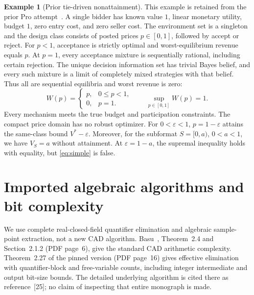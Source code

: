 \documentclass[11pt,a4paper]{article}
\numberwithin{equation}{section}
\theoremstyle{definition}
\newtheorem{example}[theorem]{Example}
\begin{document}
\begin{example}[Prior tie-driven nonattainment]\label{ex:nonattainment}
This example is retained from the prior Pro attempt~\cite{PriorPro}.
A single bidder has known value \(1\), linear monetary utility, budget
\(1\), zero entry cost, and zero seller cost.
The environment set is a singleton and the design class consists of
posted prices \(p\in[0,1]\), followed by accept or reject.
For \(p<1\), acceptance is strictly optimal and worst-equilibrium
revenue equals \(p\).
At \(p=1\), every acceptance mixture is sequentially rational,
including certain rejection.
The unique decision information set has trivial Bayes belief, and
every such mixture is a limit of completely mixed strategies with
that belief. Thus all are sequential equilibria and worst revenue is zero:
\[
 W(p)=
 \begin{cases}p,&0\le p<1,\\0,&p=1.\end{cases}
 \qquad \sup_{p\in[0,1]}W(p)=1.
\]
Every mechanism meets the true budget and participation constraints.
The compact price domain has no robust optimizer.
For \(0<\varepsilon<1\), \(p=1-\varepsilon\) attains the
same-class bound \(V^*-\varepsilon\).
Moreover, for the subformat \(S=[0,a)\), \(0<a<1\), we have
\(V_S=a\) without attainment.
At \(\varepsilon=1-a\), the supremal inequality holds with equality,
but \eqref{eq:simple} is false.
\end{example}

\section{Imported algebraic algorithms and bit complexity}\label{sec:complexity}
We use complete real-closed-field quantifier elimination and algebraic
sample-point extraction, not a new CAD algorithm.
Basu~\cite{Basu2014}, Theorem~2.4 and Section~2.1.2 (PDF page~6),
give the standard CAD arithmetic complexity.
Theorem~2.27 of the pinned version (PDF page~16) gives effective
elimination with quantifier-block and free-variable counts, including
integer intermediate and output bit-size bounds.
The detailed underlying algorithm is cited there as reference~[25];
no claim of inspecting that entire monograph is made.
\end{document}
